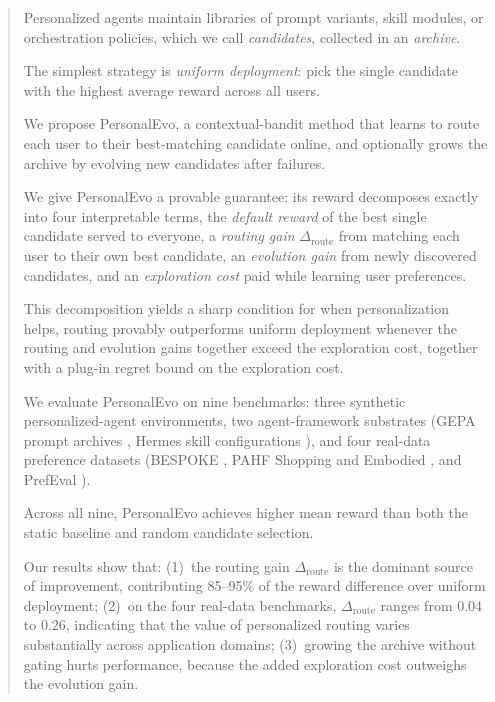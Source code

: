 \documentclass{article} %
\begin{document}
\begin{abstract}
Personalized agents maintain libraries of prompt variants, skill modules, or orchestration policies, which we call \emph{candidates}, collected in an \emph{archive}.

The simplest strategy is \emph{uniform deployment}: pick the single candidate with the highest average reward across all users.

We propose PersonalEvo, a contextual-bandit method that learns to route each user to their best-matching candidate online, and optionally grows the archive by evolving new candidates after failures.

We give PersonalEvo a provable guarantee: its reward decomposes exactly into four interpretable terms, the \emph{default reward} of the best single candidate served to everyone, a \emph{routing gain} $\Delta_{\mathrm{route}}$ from matching each user to their own best candidate, an \emph{evolution gain} from newly discovered candidates, and an \emph{exploration cost} paid while learning user preferences.

This decomposition yields a sharp condition for when personalization helps, routing provably outperforms uniform deployment whenever the routing and evolution gains together exceed the exploration cost, together with a plug-in regret bound on the exploration cost.

We evaluate PersonalEvo on nine benchmarks: three synthetic personalized-agent environments, two agent-framework substrates (GEPA prompt archives \citep{agrawal2025geparp}, Hermes skill configurations \citep{hermes_selfevolution}), and four real-data preference datasets (BESPOKE \citep{jin2026personalizing}, PAHF Shopping and Embodied \citep{pahf2025}, and PrefEval \citep{zhao2025prefeval}).

Across all nine, PersonalEvo achieves higher mean reward than both the static baseline and random candidate selection.

Our results show that: (1)~the routing gain $\Delta_{\mathrm{route}}$ is the dominant source of improvement, contributing 85--95\% of the reward difference over uniform deployment; (2)~on the four real-data benchmarks, $\Delta_{\mathrm{route}}$ ranges from $0.04$ to $0.26$, indicating that the value of personalized routing varies substantially across application domains; (3)~growing the archive without gating hurts performance, because the added exploration cost outweighs the evolution gain.


\end{abstract}
\end{document}
